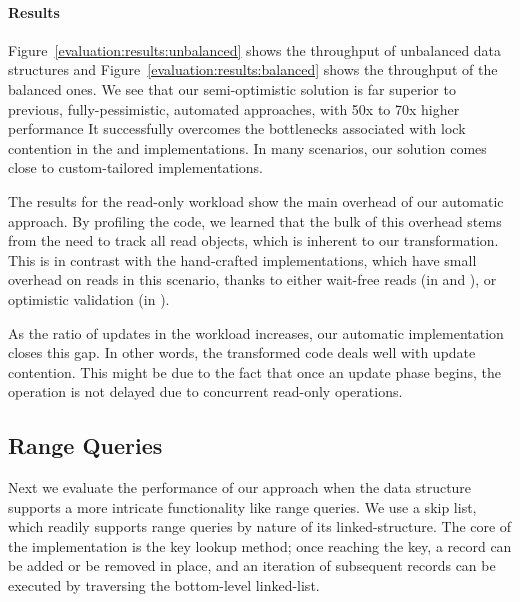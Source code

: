 \paragraph{Results}
Figure~\ref{evaluation:results:unbalanced}
shows the throughput of unbalanced data structures and Figure~\ref{evaluation:results:balanced} shows
the throughput of the balanced ones. We see that our semi-optimistic
solution is far superior to previous, fully-pessimistic,
automated approaches, with 50x to 70x
higher performance
It successfully overcomes the bottlenecks associated with lock contention
in the \domTree and \domTreap implementations. In
many scenarios, our solution comes close to custom-tailored implementations.


The results for the read-only workload show the main overhead
of our automatic approach. By profiling the code, we learned
that the bulk of this overhead stems from the need to track all read objects,
which is inherent to our transformation.
This is in contrast with the hand-crafted implementations,
which have small overhead on reads in this scenario, thanks to either
wait-free reads (in \danaTree and \danaAVL), or optimistic validation (in \bronson).

As the ratio of updates in the workload increases, our automatic implementation
closes this gap.
In other words, the transformed code deals well with update contention.
This might be due to the fact that once
an update phase begins, the operation is not delayed due to concurrent
read-only operations.


\subsection{Range Queries}
\label{sec:range}

Next we evaluate the performance of our approach when the data
structure supports a more intricate functionality like range queries.
We use a skip list, which readily supports range queries by
nature of its linked-structure. The core of the implementation is the key lookup
method; once reaching the key, a record can be added or be removed in place, and
an iteration of subsequent records can be executed by traversing
the bottom-level linked-list.

